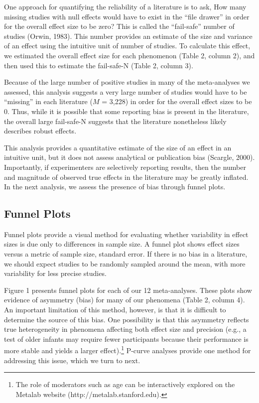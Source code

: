 \documentclass[english,floatsintext,man]{apa6}
\theoremstyle{definition}
\theoremstyle{definition}
\theoremstyle{remark}
\begin{document}
One approach for quantifying the reliability of a literature is to ask,
How many missing studies with null effects would have to exist in the
\enquote{file drawer} in order for the overall effect size to be zero?
This is called the \enquote{fail-safe} number of studies (Orwin, 1983).
This number provides an estimate of the size and variance of an effect
using the intuitive unit of number of studies. To calculate this effect,
we estimated the overall effect size for each phenomenon (Table 2,
column 2), and then used this to estimate the fail-safe-N (Table 2,
column 3).

Because of the large number of positive studies in many of the
meta-analyses we assessed, this analysis suggests a very large number of
studies would have to be \enquote{missing} in each literature (\(M\) =
3,228) in order for the overall effect sizes to be 0. Thus, while it is
possible that some reporting bias is present in the literature, the
overall large fail-safe-N suggests that the literature nonetheless
likely describes robust effects.

This analysis provides a quantitative estimate of the size of an effect
in an intuitive unit, but it does not assess analytical or publication
bias (Scargle, 2000). Importantly, if experimenters are selectively
reporting results, then the number and magnitude of observed true
effects in the literature may be greatly inflated. In the next analysis,
we assess the presence of bias through funnel plots.

\subsection{Funnel Plots}\label{funnel-plots}

Funnel plots provide a visual method for evaluating whether variability
in effect sizes is due only to differences in sample size. A funnel plot
shows effect sizes versus a metric of sample size, standard error. If
there is no bias in a literature, we should expect studies to be
randomly sampled around the mean, with more variability for less precise
studies.

Figure 1 presents funnel plots for each of our 12 meta-analyses. These
plots show evidence of asymmetry (bias) for many of our phenomena (Table
2, column 4). An important limitation of this method, however, is that
it is difficult to determine the source of this bias. One possibility is
that this asymmetry reflects true heterogeneity in phenomena affecting
both effect size and precision (e.g., a test of older infants may
require fewer participants because their performance is more stable and
yields a larger
effect).\footnote{The role of moderators such as age can be interactively explored on the Metalab website (http://metalab.stanford.edu).}
P-curve analyses provide one method for addressing this issue, which we
turn to next.
\end{document}
